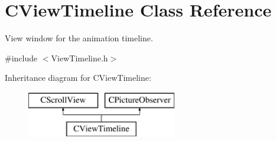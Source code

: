 \hypertarget{class_c_view_timeline}{\section{C\+View\+Timeline Class Reference}
\label{class_c_view_timeline}
}


View window for the animation timeline.  




{\ttfamily \#include $<$View\+Timeline.\+h$>$}

Inheritance diagram for C\+View\+Timeline\+:\begin{figure}[H]
\begin{center}
\leavevmode
\includegraphics[height=2.000000cm]{class_c_view_timeline}
\end{center}
\end{figure}
